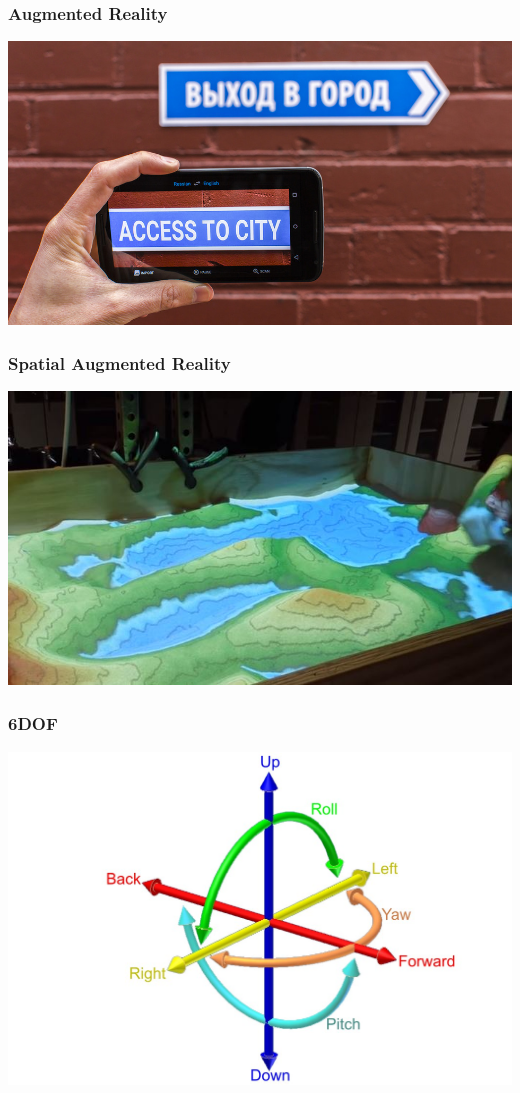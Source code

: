 \documentclass{beamer}
\begin{document}
\begin{frame}
	\frametitle{Augmented Reality}
	\includegraphics[width=\textwidth]{images/google-translate}
\end{frame}

\begin{frame}
	\frametitle{Spatial Augmented Reality}
	\includegraphics[width=\textwidth]{images/Augmented-Reality-Sandbox}
\end{frame}

\begin{frame}
	\frametitle{6DOF}
	\includegraphics[width=\textwidth]{../Sample_paper/images/6DOF_en}
\end{frame}
\end{document}

